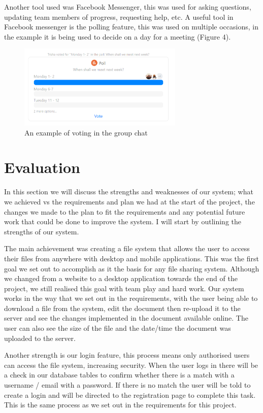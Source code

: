 \documentclass[11pt]{article}
\begin{document}
Another tool used was Facebook Messenger, this was used for asking questions, updating team members of progress, requesting help, etc. A useful tool in Facebook messenger is the polling feature, this was used on multiple occasions, in the example it is being used to decide on a day for a meeting (Figure 4). 

\begin{figure} [h!]
\caption{An example of voting in the group chat}
\centering
\includegraphics[width=0.7\textwidth]{figure3.PNG}
\end{figure}

\section{Evaluation}

In this section we will discuss the strengths and weaknesses of our system; what we achieved vs the requirements and plan we had at the start of the project, the changes we made to the plan to fit the requirements and any potential future work that could be done to improve the system. I will start by outlining the strengths of our system. 

The main achievement was creating a file system that allows the user to access their files from anywhere with desktop and mobile applications. This was the first goal we set out to accomplish as it the basis for any file sharing system. Although we changed from a website to a desktop application towards the end of the project, we still realised this goal with team play and hard work. Our system works in the way that we set out in the requirements, with the user being able to download a file from the system, edit the document then re-upload it to the server and see the changes implemented in the document available online. The user can also see the size of the file and the date/time the document was uploaded to the server.

Another strength is our login feature, this process means only authorised users can access the file system, increasing security. When the user logs in there will be a check in our database tables to confirm whether there is a match with a username / email with a password. If there is no match the user will be told to create a login and will be directed to the registration page to complete this task. This is the same process as we set out in the requirements for this project.
\end{document}
